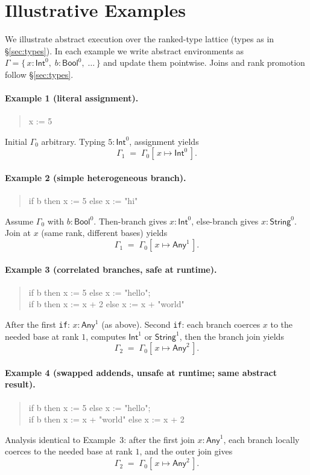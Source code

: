 \section{Illustrative Examples}
\label{sec:examples}

We illustrate abstract execution over the ranked-type lattice (types as in \S\ref{sec:types}).  
In each example we write abstract environments as
$\Gamma = \{\, x : \textsf{Int}^{0},\; b : \textsf{Bool}^{0},\;\dots \,\}$
and update them pointwise. Joins and rank promotion follow \S\ref{sec:types}.

\paragraph{Example 1 (literal assignment).}
\begin{quote}\ttfamily
x := 5
\end{quote}
Initial $\Gamma_0$ arbitrary.  
Typing $5:\textsf{Int}^{0}$, assignment yields
\[
\Gamma_1 \;=\; \Gamma_0[\,x \mapsto \textsf{Int}^{0}\,].
\]

\paragraph{Example 2 (simple heterogeneous branch).}
\begin{quote}\ttfamily
if b then x := 5 else x := "hi"
\end{quote}
Assume $\Gamma_0$ with $b:\textsf{Bool}^{0}$.  
Then-branch gives $x:\textsf{Int}^{0}$, else-branch gives $x:\textsf{String}^{0}$.  
Join at $x$ (same rank, different bases) yields
\[
\Gamma_1 \;=\; \Gamma_0[\,x \mapsto \textsf{Any}^{1}\,].
\]

\paragraph{Example 3 (correlated branches, safe at runtime).}
\begin{quote}\ttfamily
if b then x := 5 else x := "hello";\\
if b then x := x + 2 else x := x + "world"
\end{quote}
After the first \texttt{if}: $x:\textsf{Any}^{1}$ (as above).  
Second \texttt{if}: each branch coerces $x$ to the needed base at rank $1$,
computes $\textsf{Int}^{1}$ or $\textsf{String}^{1}$, then the branch join yields
\[
\Gamma_2 \;=\; \Gamma_0[\,x \mapsto \textsf{Any}^{2}\,].
\]

\paragraph{Example 4 (swapped addends, unsafe at runtime; same abstract result).}
\begin{quote}\ttfamily
if b then x := 5 else x := "hello";\\
if b then x := x + "world" else x := x + 2
\end{quote}
Analysis identical to Example~3: after the first join $x:\textsf{Any}^{1}$, each branch
locally coerces to the needed base at rank $1$, and the outer join gives
\[
\Gamma_2 \;=\; \Gamma_0[\,x \mapsto \textsf{Any}^{2}\,].
\]

